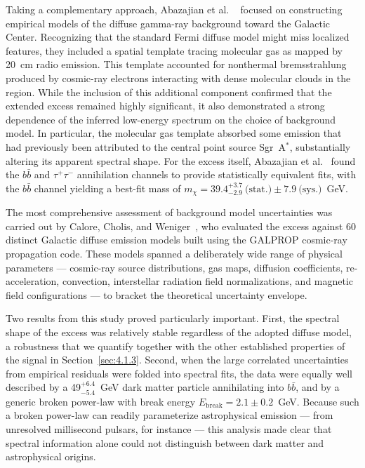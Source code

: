 Taking a complementary approach, Abazajian et al.
\ \cite{Abazajian:2014fta} focused on constructing empirical models of the diffuse gamma-ray background toward the Galactic Center.
Recognizing that the standard Fermi diffuse model might miss localized features, they included a spatial template tracing molecular gas as mapped by 20~cm radio emission.
This template accounted for nonthermal bremsstrahlung produced by cosmic-ray electrons interacting with dense molecular clouds in the region.
While the inclusion of this additional component confirmed that the extended excess remained highly significant, it also demonstrated a strong dependence of the inferred low-energy spectrum on the choice of background model.
In particular, the molecular gas template absorbed some emission that had previously been attributed to the central point source Sgr~A$^*$, substantially altering its apparent spectral shape.
For the excess itself, Abazajian et al.
\ found the $b\bar{b}$ and $\tau^+\tau^-$ annihilation channels to provide statistically equivalent fits, with the $b\bar{b}$ channel yielding a best-fit mass of $m_\chi = 39.4^{+3.7}_{-2.9}~\text{(stat.)} \pm 7.9~\text{(sys.)}$~GeV.

The most comprehensive assessment of background model uncertainties was carried out by Calore, Cholis, and Weniger~\cite{Calore:2014xka}, who evaluated the excess against 60 distinct Galactic diffuse emission models built using the GALPROP cosmic-ray propagation code.
These models spanned a deliberately wide range of physical parameters --- cosmic-ray source distributions, gas maps, diffusion coefficients, re-acceleration, convection, interstellar radiation field normalizations, and magnetic field configurations --- to bracket the theoretical uncertainty envelope.

Two results from this study proved particularly important.
First, the spectral shape of the excess was relatively stable regardless of the adopted diffuse model, a robustness that we quantify together with the other established properties of the signal in Section~\ref{sec:4.1.3}.
Second, when the large correlated uncertainties from empirical residuals were folded into spectral fits, the data were equally well described by a 49$^{+6.4}_{-5.4}$~GeV dark matter particle annihilating into $b\bar{b}$, and by a generic broken power-law with break energy $E_\text{break} = 2.1 \pm 0.2$~GeV.
Because such a broken power-law can readily parameterize astrophysical emission --- from unresolved millisecond pulsars, for instance --- this analysis made clear that spectral information alone could not distinguish between dark matter and astrophysical origins.

